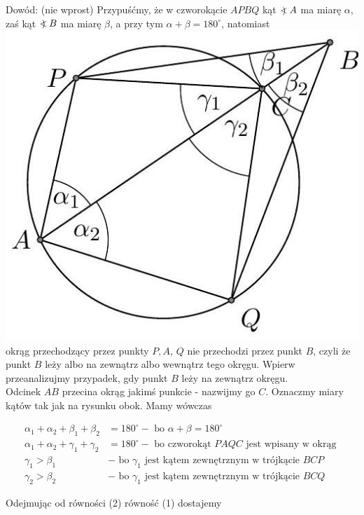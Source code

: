 \documentclass[10pt]{article}
\newcommand\Varangle{\mathop{{<\!\!\!\!\!\text{\small)}}\:}\nolimits}
\begin{document}
Dowód: (nie wprost) Przypuśćmy, że w czworokącie \(A P B Q\) kąt \(\Varangle A\) ma miarę \(\alpha\), zaś kąt \(\Varangle B\) ma miarę \(\beta\), a przy tym \(\alpha+\beta=180^{\circ}\), natomiast\\
\includegraphics[max width=\textwidth, center]{2024_11_21_71f62bd117d375398909g-198(1)}\\
okrąg przechodzący przez punkty \(P, A\), \(Q\) nie przechodzi przez punkt \(B\), czyli że punkt \(B\) leży albo na zewnątrz albo wewnątrz tego okręgu. Wpierw przeanalizujmy przypadek, gdy punkt \(B\) leży na zewnątrz okręgu.\\
Odcinek \(A B\) przecina okrąg jakimś punkcie - nazwijmy go \(C\). Oznaczmy miary kątów tak jak na rysunku obok. Mamy wówczas

\[
\begin{aligned}
\alpha_{1}+\alpha_{2}+\beta_{1}+\beta_{2} & =180^{\circ}-\text { bo } \alpha+\beta=180^{\circ} \\
\alpha_{1}+\alpha_{2}+\gamma_{1}+\gamma_{2} & =180^{\circ}-\text { bo czworokąt } P A Q C \text { jest wpisany w okrąg } \\
\gamma_{1}>\beta_{1} & - \text { bo } \gamma_{1} \text { jest kątem zewnętrznym w trójkącie } B C P \\
\gamma_{2}>\beta_{2} & - \text { bo } \gamma_{1} \text { jest kątem zewnętrznym w trójkącie } B C Q
\end{aligned}
\]

Odejmując od równości (2) równość (1) dostajemy
\end{document}
